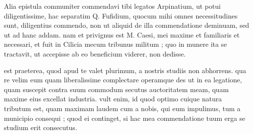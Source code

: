 


 Alia epistula communiter commendavi tibi legatos Arpinatium, ut potui diligentissime, hac separatim Q. Fufidium, quocum mihi omnes necessitudines sunt, diligentius commendo, non ut aliquid de illa commendatione deminuam, sed ut ad hanc addam. nam et privignus est M. Caesi, mei maxime et familiaris et necessari, et fuit in Cilicia mecum tribunus militum ; quo in munere ita se tractavit, ut accepisse ab eo beneficium viderer, non dedisse.

 est praeterea, quod apud te valet plurimum, a nostris studiis non abhorrens. qua re velim eum quam liberalissime complectare operamque des ut in ea legatione, quam suscepit contra suum commodum secutus auctoritatem meam, quam maxime eius excellat industria. vult enim, id quod optimo cuique natura tributum est, quam maximam laudem cum a nobis, qui eum impulimus, tum a municipio consequi ; quod ei continget, si hac mea commendatione tuum erga se studium erit consecutus.
